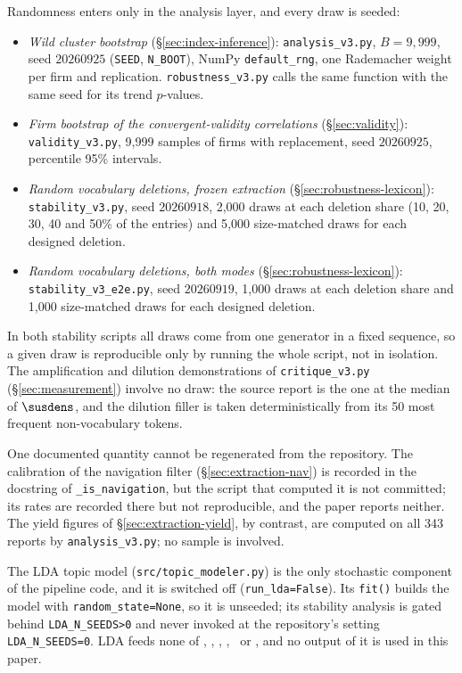 Randomness enters only in the analysis layer, and every draw is seeded:

\begin{itemize}
  \item \emph{Wild cluster bootstrap} (\S\ref{sec:index-inference}):
        \nolinkurl{analysis_v3.py}, $B = 9{,}999$, seed $20260925$
        (\texttt{SEED}, \texttt{N\_BOOT}), NumPy \texttt{default\_rng}, one
        Rademacher weight per firm and replication.
        \nolinkurl{robustness_v3.py} calls the same function with the same seed
        for its trend $p$-values.
  \item \emph{Firm bootstrap of the convergent-validity correlations}
        (\S\ref{sec:validity}): \nolinkurl{validity_v3.py}, 9{,}999 samples of
        firms with replacement, seed $20260925$, percentile 95\% intervals.
  \item \emph{Random vocabulary deletions, frozen extraction}
        (\S\ref{sec:robustness-lexicon}): \nolinkurl{stability_v3.py}, seed
        $20260918$, 2{,}000 draws at each deletion share (10, 20, 30, 40 and
        50\% of the entries) and 5{,}000 size-matched draws for each designed
        deletion.
  \item \emph{Random vocabulary deletions, both modes}
        (\S\ref{sec:robustness-lexicon}): \nolinkurl{stability_v3_e2e.py},
        seed $20260919$, 1{,}000 draws at each deletion share and 1{,}000
        size-matched draws for each designed deletion.
\end{itemize}

In both stability scripts all draws come from one generator in a fixed
sequence, so a given draw is reproducible only by running the whole script,
not in isolation. The amplification and dilution demonstrations of
\nolinkurl{critique_v3.py} (\S\ref{sec:measurement}) involve no draw: the
source report is the one at the median of $\susdens$, and the dilution filler
is taken deterministically from its 50 most frequent non-vocabulary tokens.

One documented quantity cannot be regenerated from the repository. The
calibration of the navigation filter (\S\ref{sec:extraction-nav}) is recorded
in the docstring of \texttt{\_is\_navigation}, but the script that computed it
is not committed; its rates are recorded there but not reproducible, and the
paper reports neither. The yield figures of
\S\ref{sec:extraction-yield}, by contrast, are computed on all 343 reports by
\nolinkurl{analysis_v3.py}; no sample is involved.

The LDA topic model (\nolinkurl{src/topic_modeler.py}) is the only
stochastic component of the pipeline code, and it is switched off
(\texttt{run\_lda=False}). Its \texttt{fit()} builds the model with
\texttt{random\_state=None}, so it is unseeded; its stability analysis is
gated behind \texttt{LDA\_N\_SEEDS>0} and never invoked at the repository's
setting \texttt{LDA\_N\_SEEDS=0}. LDA feeds none of \SUS, \SEN, \QUANT,
\HEDGE, \ESGSI\ or \ESGSIext, and no output of it is used in this paper.


